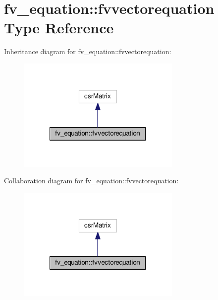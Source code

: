 \hypertarget{structfv__equation_1_1fvvectorequation}{\section{fv\-\_\-equation\-:\-:fvvectorequation Type Reference}
\label{structfv__equation_1_1fvvectorequation}
}


Inheritance diagram for fv\-\_\-equation\-:\-:fvvectorequation\-:\nopagebreak
\begin{figure}[H]
\begin{center}
\leavevmode
\includegraphics[width=224pt]{structfv__equation_1_1fvvectorequation__inherit__graph}
\end{center}
\end{figure}


Collaboration diagram for fv\-\_\-equation\-:\-:fvvectorequation\-:\nopagebreak
\begin{figure}[H]
\begin{center}
\leavevmode
\includegraphics[width=224pt]{structfv__equation_1_1fvvectorequation__coll__graph}
\end{center}
\end{figure}

